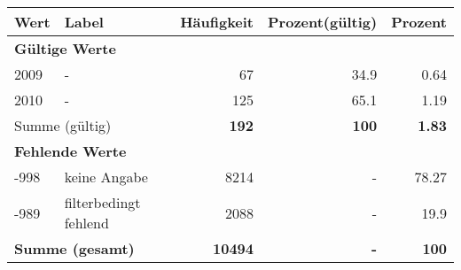      \begin{longtable}{lXrrr}
     \toprule
     \textbf{Wert} & \textbf{Label} & \textbf{Häufigkeit} & \textbf{Prozent(gültig)} & \textbf{Prozent} \\
     \endhead
     \midrule
     \multicolumn{5}{l}{\textbf{Gültige Werte}}\\

     2009 &
     \multicolumn{1}{X}{ -  } &


       \num{67} &
       \num[round-mode=places,round-precision=2]{34,9} &
         \num[round-mode=places,round-precision=2]{0,64} \\

     2010 &
     \multicolumn{1}{X}{ -  } &


       \num{125} &
       \num[round-mode=places,round-precision=2]{65,1} &
         \num[round-mode=places,round-precision=2]{1,19} \\
     \midrule
     \multicolumn{2}{l}{Summe (gültig)} &
       \textbf{\num{192}} &
     \textbf{100} &
       \textbf{\num[round-mode=places,round-precision=2]{1,83}} \\
     \multicolumn{5}{l}{\textbf{Fehlende Werte}}\\
       -998 &
       keine Angabe &
         \num{8214} &
        - &
         \num[round-mode=places,round-precision=2]{78,27} \\
       -989 &
       filterbedingt fehlend &
         \num{2088} &
        - &
         \num[round-mode=places,round-precision=2]{19,9} \\
     \midrule
     \multicolumn{2}{l}{\textbf{Summe (gesamt)}} &
          \textbf{\num{10494}} &
        \textbf{-} &
        \textbf{100} \\
     \bottomrule
     \end{longtable}
     
